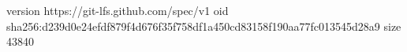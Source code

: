 version https://git-lfs.github.com/spec/v1
oid sha256:d239d0e24efdf879f4d676f35f758df1a450cd83158f190aa77fc013545d28a9
size 43840
